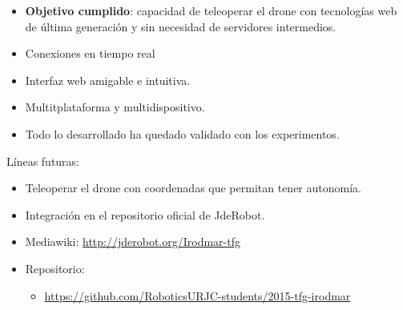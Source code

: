 \documentclass[notes,slidesec,a4]{seminar}
\begin{document}
\begin{hslide}
\begin{itemize}
\item \textbf{Objetivo cumplido}: capacidad de teleoperar el drone con tecnologías web de última generación y sin necesidad de servidores intermedios.
\item Conexiones en tiempo real
\item Interfaz web amigable e intuitiva.
\item Multitplataforma y multidispositivo.
\item Todo lo desarrollado ha quedado validado con los experimentos.
\end{itemize}
\vspace{0.5cm}
Líneas futuras:
\begin{itemize}
\item Teleoperar el drone con coordenadas que permitan tener autonomía.
\item Integración en el repositorio oficial de JdeRobot.
\end{itemize}
\end{hslide}


\begin{hslide}
\begin{itemize}
\item Mediawiki: \url{http://jderobot.org/Irodmar-tfg}
\item Repositorio: 
\begin{itemize}
\item \url{https://github.com/RoboticsURJC-students/2015-tfg-irodmar}
\end{itemize}
\end{itemize}
\end{hslide}
\end{document}
